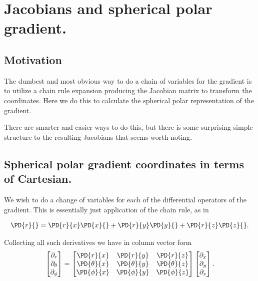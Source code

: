 

\chapter{Jacobians and spherical polar gradient.}
\label{chap:jacobianSphericalPolar}
{}
\date{Dec 6, 2009}

\beginArtWithToc

\section{Motivation}

The dumbest and most obvious way to do a chain of variables for the gradient is to utilize a chain rule expansion producing the Jacobian matrix to transform the coordinates.  Here we do this to calculate the spherical polar representation of the gradient.

There are smarter and easier ways to do this, but there is some surprising simple structure to the resulting Jacobians that seems worth noting.

\section{Spherical polar gradient coordinates in terms of Cartesian.}

We wish to do a change of variables for each of the differential operators of the gradient.  This is essentially just application of the chain rule, as in

\begin{align}\label{eqn:jacobianSphericalPolar:1}
\PD{r}{} 
= 
\PD{r}{x} \PD{x}{}
+\PD{r}{y} \PD{y}{}
+\PD{r}{z} \PD{z}{}.
\end{align}

Collecting all such derivatives we have in column vector form 
\begin{align}\label{eqn:jacobianSphericalPolar:2}
\begin{bmatrix}
\partial_r \\
\partial_\theta \\
\partial_\phi
\end{bmatrix}
= 
\begin{bmatrix}
\PD{r}{x} &\PD{r}{y} &\PD{r}{z}  \\
\PD{\theta}{x} &\PD{\theta}{y} &\PD{\theta}{z}  \\
\PD{\phi}{x} &\PD{\phi}{y} &\PD{\phi}{z} 
\end{bmatrix}
\begin{bmatrix}
\partial_x \\
\partial_y \\
\partial_z
\end{bmatrix}.
\end{align}

